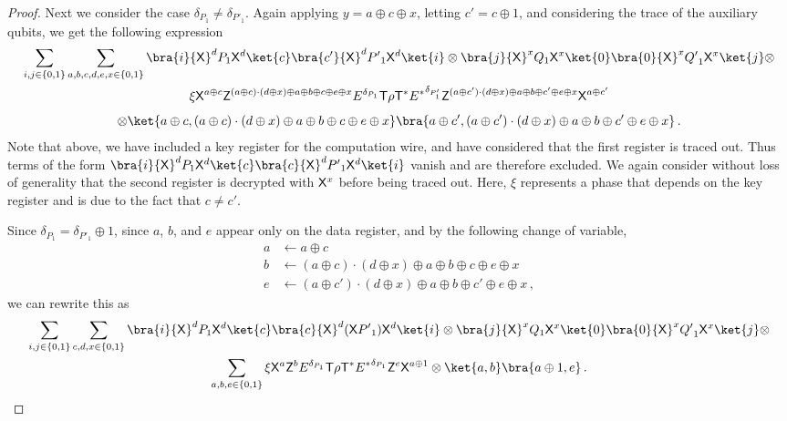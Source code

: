 \documentclass{toc}
\newcommand{\tgate}{{\sf T}}
\newcommand{\xgate}{{\sf X}}
\newcommand{\zgate}{{\sf Z}}
\newcommand{\ketbra}[2]{\ket{#1}\bra{#2}}			%
\newcommand{\egoketbra}[1]{\ketbra{#1}{#1}}			%
\begin{document}
\begin{proof}
%
 Next we consider the case $\delta_{P_1} \neq \delta_{P'_1}$.
  Again applying  $ y =a \oplus c \oplus x$, letting $c' = c \oplus 1$, and considering the trace of the auxiliary qubits, we get the following
 expression%
\begin{multline} \label{eqn:t-gate-first-ab2}
\sum_{i,j \in \{0,1\}}\sum_{a,b,c,d,e,x \in \{0,1\}}   \bra{i} \xgate^d P_1 \xgate^d \ketbra{c}{c'} \xgate^d {{P'}_1} \xgate^d \ket{i}   \otimes
\bra{j} \xgate^x Q_1
 \xgate^x \egoketbra{0} \xgate^x {{Q'}_1} \xgate^x \ket{j} \otimes
 \\ \xi  \xgate^{a\oplus c}  \zgate^{(a \oplus c) \cdot (d \oplus x) \oplus a \oplus  b \oplus c \oplus e \oplus x}  E^{\delta_{P_1}} \tgate \rho \tgate^*  {E^*}^{\delta_{P'_1} }
    \zgate^{(a \oplus c') \cdot (d \oplus x) \oplus a \oplus  b \oplus c' \oplus e \oplus x}  \xgate^{a\oplus c'} \\[1ex]
 \otimes \ket{a \oplus c, (a \oplus c) \cdot (d \oplus x) \oplus a \oplus b \oplus c \oplus e \oplus x  } \bra{a \oplus c' ,(a \oplus c') \cdot (d \oplus x) \oplus a \oplus b \oplus c' \oplus e \oplus x}\,.
 \end{multline}
Note that above, we have included a key register for the computation wire, and have considered that the first register is traced out. %
%
 Thus terms of the form
$\bra{i}  \xgate^d P_1 \xgate^d \ketbra{c}{c} \xgate^d {{P'}_1} \xgate^d  \ket{i}$ vanish and are therefore excluded.
We again consider without loss of generality that the second register is decrypted with $\xgate^x$ before being traced out. Here, $\xi$ represents a phase that depends on the key register and is due to the fact that $c \neq c'$.



Since $\delta_{P_1} =  \delta_{P'_1} \oplus 1$, since  $a$, $b$, and $e$ appear only on the data register, and by the following change of variable,
\begin{align}
 a &\leftarrow a \oplus c\\
 b & \leftarrow  (a \oplus c) \cdot (d \oplus x) \oplus a \oplus  b \oplus c \oplus e \oplus x \\
 e & \leftarrow  (a \oplus c') \cdot (d \oplus x) \oplus a \oplus b \oplus c' \oplus e \oplus x\,,
\end{align}
we can
%
rewrite  %
this as
\begin{multline} \label{eqn:t-gate-first-ab3}
\sum_{i,j \in \{0,1\}}\sum_{c,d,x \in \{0,1\}}   \bra{i} \xgate^d P_1 \xgate^d \ketbra{c}{c} \xgate^d (\xgate {{P'}_1}) \xgate^d \ket{i}   \otimes
\bra{j} \xgate^x Q_1  \xgate^x \egoketbra{0} \xgate^x {{Q'}_1} \xgate^x \ket{j} \otimes
 \\  \sum_{a,b,e \in \{0,1\}} \xi  \xgate^{a}\zgate^{b}  E^{\delta_{P_1}} \tgate \rho \tgate^*  {E^*}^{\delta_{P_1}}
    \zgate^{e}  \xgate^{a \oplus 1}
 \otimes \ket{a,b} \bra{a \oplus 1,e }\,.
 \end{multline}


\end{proof}
\end{document}
